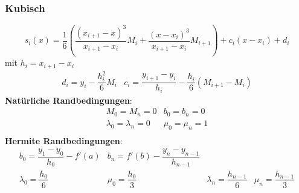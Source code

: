 \documentclass[
	ngerman,
	accentcolor=9c,%
	type=intern,
	marginpar=false
	]{tudapub}
\begin{document}
            \subsubsection{Kubisch}
            \begin{equation*}
                s_i(x) = \dfrac{1}{6} \left(
                    \dfrac{(x_{i+1} - x)^3}{x_{i+1} - x_i}M_i +
                    \dfrac{(x - x_{i})^3}{x_{i+1} - x_i}M_{i+1}
                \right)
                + c_i (x-x_i) + d_i
            \end{equation*}
            mit $h_i = x_{i+1} - x_i$
            \begin{equation*}
                \begin{matrix}
                    d_i = y_i - \dfrac{h_i^2}{6}M_i & c_i = \dfrac{y_{i+1} - y_i}{h_i}- \dfrac{h_i}{6}(M_{i+1} - M_i)
                \end{matrix}
            \end{equation*}
            \textbf{Natürliche Randbedingungen}:\\
            \begin{equation*}
                \begin{matrix}
                    M_0 = M_n = 0 & b_0 = b_n = 0\\
                    \lambda_0 = \lambda_n = 0 & \mu_0 = \mu_n = 1\\ 
                \end{matrix}
            \end{equation*}
            \textbf{Hermite Randbedingungen}:\\
            \begin{equation*}
                \begin{matrix}
                    b_0 = \dfrac{y_1-y_0}{h_0} - f'(a) & b_n = f'(b) - \dfrac{y_n - y_{n-1}}{h_{n-1}} & & \\
                    \lambda_0 =\dfrac{h_0}{6} & \mu_0 = \dfrac{h_0}{3} & \lambda_n = \dfrac{h_{n-1}}{6} & \mu_n = \dfrac{h_{n-1}}{3}\\
                \end{matrix}
            \end{equation*}
\end{document}
